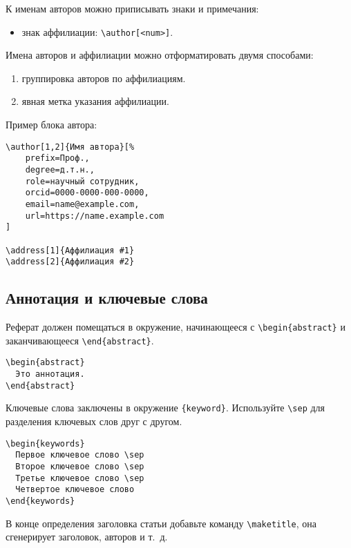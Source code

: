 \documentclass[
12pt,
polyglossia,   %
firacode,    %
wordmath,      %
russian        %
]{isdctart}
\begin{document}
К именам авторов можно приписывать знаки и примечания:
\begin{itemize}
\item знак аффилиации: \verb|\author[<num>]|.
\end{itemize}

Имена авторов и аффилиации можно отформатировать двумя способами:
\begin{enumerate}
\item группировка авторов по аффилиациям.
\item явная метка указания аффилиации.
\end{enumerate}
Пример блока автора:
\begin{verbatim}
\author[1,2]{Имя автора}[%
    prefix=Проф.,
    degree=д.т.н.,
    role=научный сотрудник,
    orcid=0000-0000-000-0000,
    email=name@example.com,
    url=https://name.example.com
]

\address[1]{Аффилиация #1}
\address[2]{Аффилиация #2}
\end{verbatim}

\subsection{Аннотация и ключевые слова}

Реферат должен помещаться в окружение, начинающееся с \verb|\begin{abstract}| и заканчивающееся \verb|\end{abstract}|.

\begin{verbatim}
\begin{abstract}
  Это аннотация.
\end{abstract}
\end{verbatim}

Ключевые слова заключены в окружение \verb|{keyword}|. Используйте \verb|\sep| для разделения ключевых слов друг с другом.

\begin{verbatim}
\begin{keywords}
  Первое ключевое слово \sep
  Второе ключевое слово \sep
  Третье ключевое слово \sep
  Четвертое ключевое слово
\end{keywords}
\end{verbatim}
В конце определения заголовка статьи добавьте команду \verb|\maketitle|, она сгенерирует заголовок, авторов и т.~д.
\end{document}

